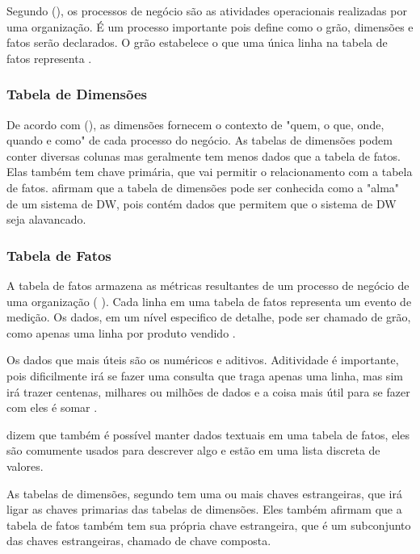 Segundo \citeauthor{kimball2013} (\citeyear{kimball2013}), os processos de negócio são as atividades operacionais realizadas por uma organização. É um processo importante pois define como o grão, dimensões e fatos serão declarados. O grão estabelece o que uma única linha na tabela de fatos representa \citep{kimball2013}.

\subsubsection{Tabela de Dimensões}
De acordo com \citeauthor{kimball2013} (\citeyear{kimball2013}), as dimensões fornecem o contexto de "quem, o que, onde, quando e como" de cada processo do negócio. As tabelas de dimensões podem conter diversas colunas mas geralmente tem menos dados que a tabela de fatos. Elas também tem chave primária, que vai permitir o relacionamento com a tabela de fatos.
\citeauthor{kimball2013} \citeyear{kimball2013} afirmam que a tabela de dimensões pode ser conhecida como a "alma" de um sistema de DW, pois contém dados que permitem que o sistema de DW seja alavancado.

\subsubsection{Tabela de Fatos}
A tabela de fatos armazena as métricas resultantes de um processo de negócio de uma organização (\citeauthor{kimball2013}  \citeyear{kimball2013}). Cada linha em uma tabela de fatos representa um evento de medição. Os dados, em um nível especifico de detalhe, pode ser chamado de grão, como apenas uma linha por produto vendido \citep{kimball2013}.

Os dados que mais úteis são os numéricos e aditivos. Aditividade é importante, pois dificilmente irá se fazer uma consulta que traga apenas uma linha, mas sim irá trazer centenas, milhares ou milhões de dados e a coisa mais útil para se fazer com eles é somar \citep{kimball2013}.

 dizem que também é possível manter dados textuais em uma tabela de fatos, eles são comumente usados para descrever algo e estão em uma lista discreta de valores. 

As tabelas de dimensões, segundo  tem uma ou mais chaves estrangeiras, que irá ligar as chaves primarias das tabelas de dimensões. Eles também afirmam que a tabela de fatos também tem sua própria chave estrangeira, que é um subconjunto das chaves estrangeiras, chamado de chave composta. 

